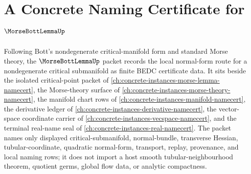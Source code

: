 \chapter{A Concrete Naming Certificate for $\MorseBottLemmaUp$}
\label{ch:concrete-instances-morse-bott-lemma-namecert}

Following Bott's nondegenerate critical-manifold form and standard Morse theory, the $\MorseBottLemmaUp$ packet records the local normal-form route for a nondegenerate critical submanifold as finite BEDC certificate data. It sits beside the isolated critical-point packet of \autoref{ch:concrete-instances-morse-lemma-namecert}, the Morse-theory surface of \autoref{ch:concrete-instances-morse-theory-namecert}, the manifold chart rows of \autoref{ch:concrete-instances-manifold-namecert}, the derivative ledger of \autoref{ch:concrete-instances-derivative-namecert}, the vector-space coordinate carrier of \autoref{ch:concrete-instances-vecspace-namecert}, and the terminal real-name seal of \autoref{ch:concrete-instances-real-namecert}. The packet names only displayed critical-submanifold, normal-bundle, transverse Hessian, tubular-coordinate, quadratic normal-form, transport, replay, provenance, and local naming rows; it does not import a host smooth tubular-neighbourhood theorem, quotient germs, global flow data, or analytic compactness.

